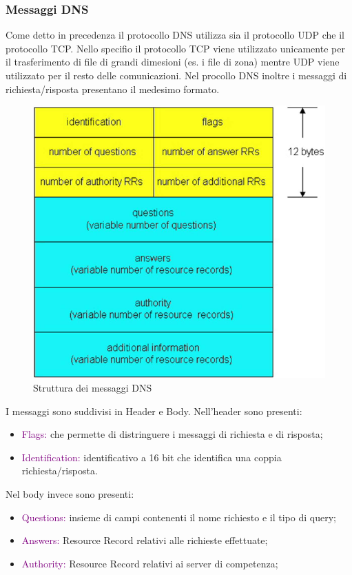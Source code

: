 \subsubsection{Messaggi DNS}
Come detto in precedenza il protocollo DNS utilizza sia il protocollo UDP che il protocollo TCP. Nello specifio il protocollo TCP viene utilizzato unicamente per il trasferimento di file di grandi dimesioni (es. i file di zona) mentre UDP viene utilizzato per il resto delle comunicazioni.
Nel procollo DNS inoltre i messaggi di richiesta/risposta presentano il medesimo formato.
\begin{figure}[h]
    \centering
    \includegraphics[scale=0.35]{Immagini/StrutturaMessaggiDNS.png}
    \caption{Struttura dei messaggi DNS}
\end{figure}
I messaggi sono suddivisi in Header e Body. Nell'header sono presenti:
\begin{itemize}
    \item \textcolor{purple}{Flags:} che permette di distringuere i messaggi di richiesta e di risposta;
    \item \textcolor{purple}{Identification:} identificativo a 16 bit che identifica una coppia richiesta/risposta.
\end{itemize}
\newpage
Nel body invece sono presenti:
\begin{itemize}
    \item \textcolor{purple}{Questions:} insieme di campi contenenti il nome richiesto e il tipo di query;
    \item \textcolor{purple}{Answers:} Resource Record relativi alle richieste effettuate;
    \item \textcolor{purple}{Authority:} Resource Record relativi ai server di competenza;
\end{itemize}

